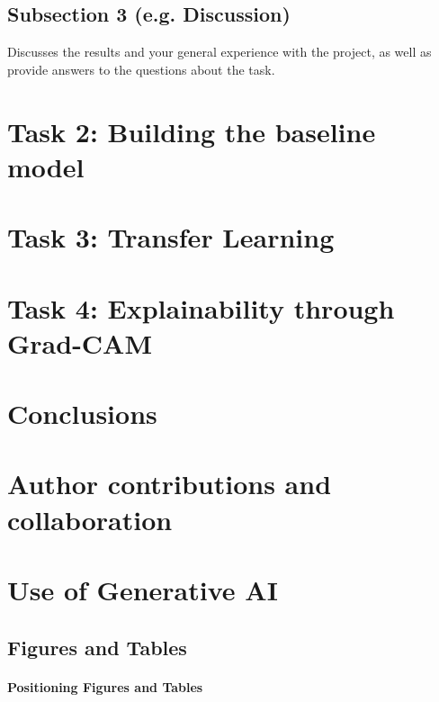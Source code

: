 \documentclass[conference]{IEEEtran}
\begin{document}
\subsection{Subsection 3 (e.g. Discussion)}
Discusses the results and your general experience with the project, as well as provide answers to the questions about the task.
\section{Task 2: Building the baseline model}
\section{Task 3: Transfer Learning}
\section{Task 4: Explainability through Grad-CAM}
\section{Conclusions}
\section{Author contributions and collaboration}
\section{Use of Generative AI}


\subsection{Figures and Tables}
\paragraph{Positioning Figures and Tables}
\end{document}
